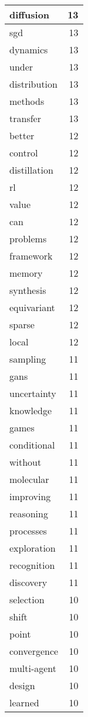 \begin{table}[h]
\begin{tabular}{|l|r|}
\hline
diffusion & 13 \\
\hline
sgd & 13 \\
\hline
dynamics & 13 \\
\hline
under & 13 \\
\hline
distribution & 13 \\
\hline
methods & 13 \\
\hline
transfer & 13 \\
\hline
better & 12 \\
\hline
control & 12 \\
\hline
distillation & 12 \\
\hline
rl & 12 \\
\hline
value & 12 \\
\hline
can & 12 \\
\hline
problems & 12 \\
\hline
framework & 12 \\
\hline
memory & 12 \\
\hline
synthesis & 12 \\
\hline
equivariant & 12 \\
\hline
sparse & 12 \\
\hline
local & 12 \\
\hline
sampling & 11 \\
\hline
gans & 11 \\
\hline
uncertainty & 11 \\
\hline
knowledge & 11 \\
\hline
games & 11 \\
\hline
conditional & 11 \\
\hline
without & 11 \\
\hline
molecular & 11 \\
\hline
improving & 11 \\
\hline
reasoning & 11 \\
\hline
processes & 11 \\
\hline
exploration & 11 \\
\hline
recognition & 11 \\
\hline
discovery & 11 \\
\hline
selection & 10 \\
\hline
shift & 10 \\
\hline
point & 10 \\
\hline
convergence & 10 \\
\hline
multi-agent & 10 \\
\hline
design & 10 \\
\hline
learned & 10 \\

\end{tabular}
\end{table}
